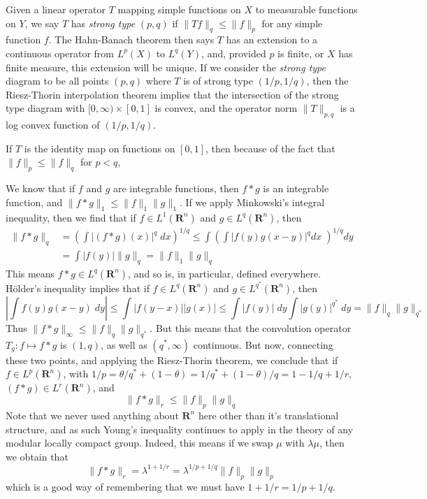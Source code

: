 Given a linear operator $T$ mapping simple functions on $X$ to measurable functions on $Y$, we say $T$ has {\it strong type} $(p,q)$ if $\| T f \|_q \leq \| f \|_p$ for any simple function $f$. The Hahn-Banach theorem then says $T$ has an extension to a continuous operator from $L^p(X)$ to $L^q(Y)$, and, provided $p$ is finite, or $X$ has finite measure, this extension will be unique. If we consider the {\it strong type} diagram to be all points $(p,q)$ where $T$ is of strong type $(1/p,1/q)$, then the Riesz-Thorin interpolation theorem implies that the intersection of the strong type diagram with $[0,\infty) \times [0,1]$ is convex, and the operator norm $\| T \|_{p,q}$ is a log convex function of $(1/p,1/q)$.

\begin{example}
	If $T$ is the identity map on functions on $[0,1]$, then because of the fact that $\| f \|_p \leq \| f \|_q$ for $p < q$,
\end{example}

\begin{example}
	We know that if $f$ and $g$ are integrable functions, then $f * g$ is an integrable function, and $\| f * g \|_1 \leq \| f \|_1 \| g \|_1$. If we apply Minkowski's integral inequality, then we find that if $f \in L^1(\mathbf{R}^n)$ and $g \in L^q(\mathbf{R}^n)$, then
	\begin{align*}
		\| f * g \|_q &= \left( \int |(f * g)(x)|^q\; dx \right)^{1/q} \leq \int \left( \int |f(y)g(x-y)|^q dx\; \right)^{1/q} dy\\
		&= \int |f(y)| \| g \|_q = \| f \|_1 \| g \|_q
	\end{align*}
	This means $f * g \in L^q(\mathbf{R}^n)$, and so is, in particular, defined everywhere. H\"{older}'s inequality implies that if $f \in L^q(\mathbf{R}^n)$ and $g \in L^{q^*}(\mathbf{R}^n)$, then
	\[ \left| \int f(y) g(x-y)\; dy \right| \leq \int |f(y-x)| |g(x)| \leq \int |f(y)|\; dy \int |g(y)|^{q^*}\; dy = \| f \|_q \| g \|_{q^*} \]
	Thus $\| f * g \|_\infty \leq \| f \|_q \| g \|_{q^*}$. But this means that the convolution operator $T_g: f \mapsto f * g$ is $(1,q)$, as well as $(q^*,\infty)$ continuous. But now, connecting these two points, and applying the Riesz-Thorin theorem, we conclude that if $f \in L^p(\mathbf{R}^n)$, with $1/p = \theta/q^* + (1 - \theta) = 1/q^* + (1-\theta)/q = 1 - 1/q + 1/r$, $(f * g) \in L^r(\mathbf{R}^n)$, and
	\[ \| f * g \|_r \leq \| f \|_p \| g \|_q \]
	Note that we never used anything about $\mathbf{R}^n$ here other than it's translational structure, and as such Young's inequality continues to apply in the theory of any modular locally compact group. Indeed, this means if we swap $\mu$ with $\lambda \mu$, then we obtain that
	\[ \| f * g \|_r = \lambda^{1 + 1/r} = \lambda^{1/p + 1/q} \| f \|_p \| g \|_p \]
	which is a good way of remembering that we must have $1 + 1/r = 1/p + 1/q$.	
\end{example}

